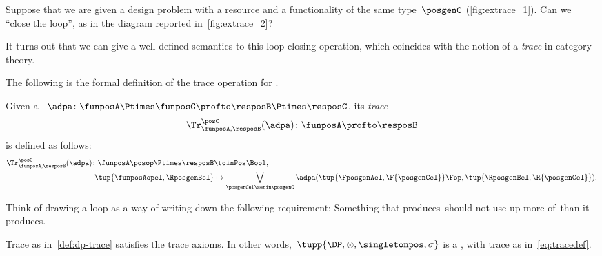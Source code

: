 Suppose that we are given a design problem with a resource and a functionality of the same type~$\posgenC$ (\cref{fig:extrace_1}).
Can we ``close the loop'', as in the diagram reported in~\cref{fig:extrace_2}?

It turns out that we can give a well-defined semantics to this loop-closing operation, which coincides with the notion of a \emph{trace} in category theory.

The following is the formal definition of the trace operation for .

\begin{ctdefinition}
    \label{def:dp-trace}
    Given a ~$\adpa\colon \funposA \Ptimes \funposC \profto \resposB \Ptimes \resposC$, its \emph{trace}
    \begin{equation}
        \Tr_{\funposA,\resposB}^\posC(\adpa) \colon \funposA \profto \resposB
    \end{equation}
    is defined as follows:
    \begin{equation}
        \label{eq:tracedef}
        \begin{aligned}
            \Tr_{\funposA,\resposB}^\posC(\adpa) \colon \funposA\posop \Ptimes \resposB & \toinPos \Bool, \\
            \tup{\funposAopel, \RposgenBel}                                             & \mapsto \bigvee_{\posgenCel \setin \posgenC}
            \adpa(\tup{\FposgenAel, \F{\posgenCel}}\Fop,
            \tup{\RposgenBel, \R{\posgenCel}}).
        \end{aligned}
    \end{equation}
\end{ctdefinition}

Think of drawing a loop as a way of writing down the following requirement:
Something that produces~\posC should not use up more of~\posC than it produces.

\begin{lemma}\label{lem:dp-trace-is-trace}
    Trace as in~\cref{def:dp-trace} satisfies the trace axioms.
    In other words,~$\tupp{\DP, {{\otimes}}, \singletonpos, \sigma}$ is a , with trace as in~\cref{eq:tracedef}.
\end{lemma}


